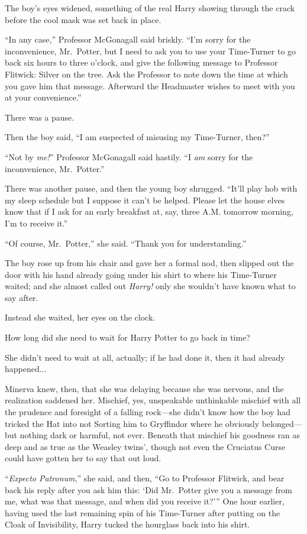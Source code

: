 The boy’s eyes widened, something of the real Harry showing through the crack before the cool mask was set back in place.

“In any case,” Professor McGonagall said briskly. “I’m sorry for the inconvenience, Mr.~Potter, but I need to ask you to use your Time-Turner to go back six hours to three o’clock, and give the following message to Professor Flitwick: Silver on the tree. Ask the Professor to note down the time at which you gave him that message. Afterward the Headmaster wishes to meet with you at your convenience.”

There was a pause.

Then the boy said, “I am suspected of misusing my Time-Turner, then?”

“Not by \emph{me!}” Professor McGonagall said hastily. “I \emph{am} sorry for the inconvenience, Mr.~Potter.”

There was another pause, and then the young boy shrugged. “It’ll play hob with my sleep schedule but I suppose it can’t be helped. Please let the house elves know that if I ask for an early breakfast at, say, three A.M. tomorrow morning, I’m to receive it.”

“Of course, Mr.~Potter,” she said. “Thank you for understanding.”

The boy rose up from his chair and gave her a formal nod, then slipped out the door with his hand already going under his shirt to where his Time-Turner waited; and she almost called out \emph{Harry!} only she wouldn’t have known what to say after.

Instead she waited, her eyes on the clock.

How long did she need to wait for Harry Potter to go back in time?

She didn’t need to wait at all, actually; if he had done it, then it had already happened...

Minerva knew, then, that she was delaying because she was nervous, and the realization saddened her. Mischief, yes, unspeakable unthinkable mischief with all the prudence and foresight of a falling rock—she didn’t know how the boy had tricked the Hat into not Sorting him to Gryffindor where he obviously belonged—but nothing dark or harmful, not ever. Beneath that mischief his goodness ran as deep and as true as the Weasley twins’, though not even the Cruciatus Curse could have gotten her to say that out loud.

“\emph{Expecto Patronum},” she said, and then, “Go to Professor Flitwick, and bear back his reply after you ask him this: ‘Did Mr.~Potter give you a message from me, what was that message, and when did you receive it?’”
\sbreak
One hour earlier, having used the last remaining spin of his Time-Turner after putting on the Cloak of Invisibility, Harry tucked the hourglass back into his shirt.

